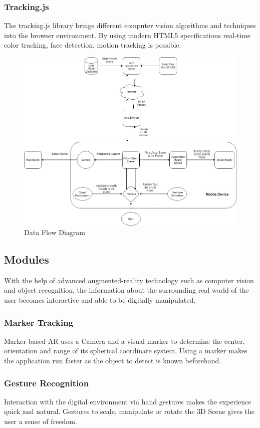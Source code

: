 \documentclass[conference]{IEEEtran}
\begin{document}
\subsubsection{Tracking.js} The tracking.js library brings different computer vision algorithms and techniques into the browser environment. By using modern HTML5 specifications real-time color tracking, face detection, motion tracking is possible.
\begin{figure}
	\includegraphics[width=\linewidth]{dataflow.jpg}
	\caption{Data Flow Diagram}
	\label{fig:data-flow}
\end{figure}
\subsection{Modules}
With the help of advanced augmented-reality technology such as computer vision and object recognition, the information about the surrounding real world of the user becomes interactive and able to be digitally manipulated. 
\subsubsection{Marker Tracking}
Marker-based AR uses a Camera and a visual marker to determine the center, orientation and range of its spherical coordinate system. Using a marker makes the application run faster as the object to detect is known beforehand.
\subsubsection{Gesture Recognition}
Interaction with the digital environment via hand gestures makes the experience quick and natural. Gestures to scale, manipulate or rotate the 3D Scene gives the user a sense of freedom.
\end{document}
